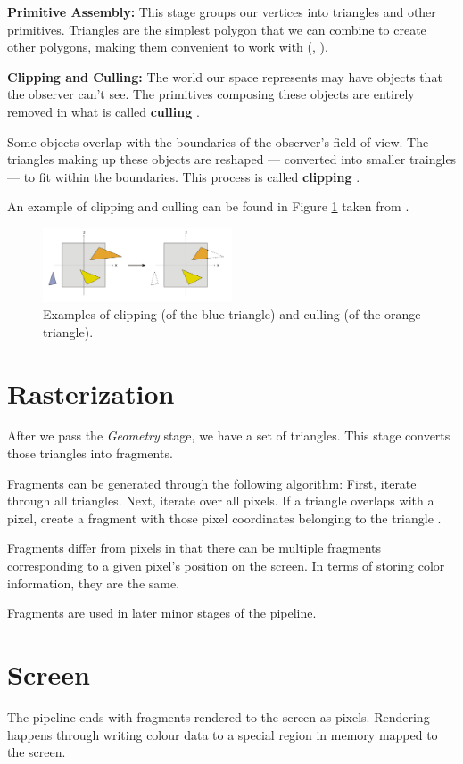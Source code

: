 \textbf{Primitive Assembly:}
This stage groups our vertices into triangles and other primitives.
Triangles are the simplest polygon that we can combine to create other polygons,
making them convenient to work with (\cite{wiki:overview}, \cite{scratchapixelRasterization}).

\textbf{Clipping and Culling:}
The world our space represents may have objects that the observer can't see.
The primitives composing these objects are entirely removed in what is called \textbf{culling} \cite{graphicscompendiumGraphicsCompendium}.

Some objects overlap with the boundaries of the observer's field of view. The
triangles making up these objects are reshaped --- converted into smaller traingles ---
to fit within the boundaries.
This process is called \textbf{clipping} \cite{graphicscompendiumGraphicsCompendium}.

An example of clipping and culling can be found in Figure \ref{fig:clip} taken from \cite{wiki:Graphics_pipeline}.

\begin{figure}[h]
    \centering
    \includegraphics[width=0.5\textwidth]{assets/Cube_clipping.png}
    \caption{Examples of clipping (of the blue triangle) and culling (of the orange triangle). }
    \label{fig:clip}
\end{figure}

\section{Rasterization}

After we pass the \textit{Geometry} stage, we have a set of triangles.
This stage converts those triangles into fragments.

Fragments can be generated through the following algorithm:
First, iterate through all triangles. Next, iterate over all pixels.
If a triangle overlaps with a pixel, create a fragment with those pixel
coordinates belonging to the triangle \cite{scratchapixelRasterization}.

Fragments differ from pixels in that there can be multiple fragments corresponding
to a given pixel's position on the screen. In terms of storing color information,
they are the same.

Fragments are used in later minor stages of the pipeline.

\section{Screen}
The pipeline ends with fragments rendered to the screen as pixels.
Rendering happens through writing colour data to a special region in memory
mapped to the screen.
